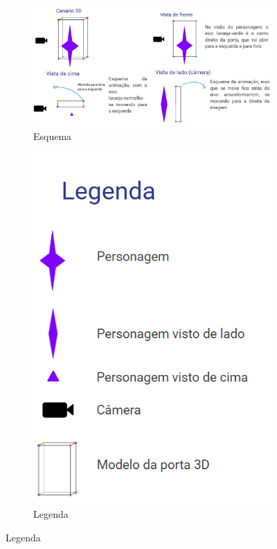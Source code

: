 \begin{figure}[htbp]
    \centering
    \caption{\small Esquema mostrando animação da porta abrindo em diferentes ângulos}
    \label{fig:geminiProPortaBEsquema}
    \begin{subfigure}{1\linewidth}
        \centering
        \includegraphics[width=1\linewidth]{figs/geminiPro/chat7/esquemaPortaSideViewCompleto.PNG}
        \caption{\small Esquema}
        \label{fig:geminiProPortaBEsquemaFigura}
    \end{subfigure}\hfill
    \begin{subfigure}{0.3\linewidth}
        \centering
        \includegraphics[width=1\linewidth]{figs/geminiPro/chat7/esquemaPortaSideViewLegenda.PNG}
        \caption{\small Legenda}
        \label{fig:geminiProPortaBEsquemaLegenda}
    \end{subfigure}\hfill


\end{figure}
